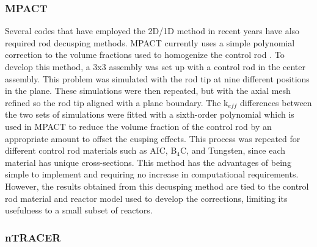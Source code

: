 \cite{cho2015CRX2d1dFusionDecusping}

\subsubsection{MPACT}

Several codes that have employed the 2D/1D method in recent years have also required rod decusping methods.  MPACT currently uses a simple polynomial correction to the volume fractions used to homogenize the control rod \cite{MC2015_VCS_Cycle_Depletion}.  To develop this method, a 3x3 assembly was set up with a control rod in the center assembly.  This problem was simulated with the rod tip at nine different positions in the plane.  These simulations were then repeated, but with the axial mesh refined so the rod tip aligned with a plane boundary.  The k$_{eff}$ differences between the two sets of simulations were fitted with a sixth-order polynomial which is used in MPACT to reduce the volume fraction of the control rod by an appropriate amount to offset the cusping effects.  This process was repeated for different control rod materials such as AIC, B$_4$C, and Tungsten, since each material has unique cross-sections.  This method has the advantages of being simple to implement and requiring no increase in computational requirements.  However, the results obtained from this decusping method are tied to the control rod material and reactor model used to develop the corrections, limiting its usefulness to a small subset of reactors.

\subsubsection{nTRACER}

